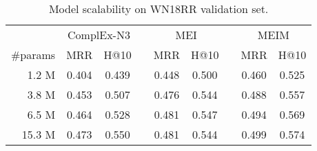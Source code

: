 \documentclass{article}
\theoremstyle{plain}
\theoremstyle{remark}
\begin{document}
\begin{table}[t]
	\centering  
	\begin{adjustbox}{max width=\linewidth}
		\begin{tabular}{@{\extracolsep{-4pt}}rcclcclcc}


			& \multicolumn{2}{c}{ComplEx-N3} && \multicolumn{2}{c}{MEI} && \multicolumn{2}{c}{MEIM} \\
			\cmidrule{2-3} \cmidrule{5-6} \cmidrule{8-9}
			\#params & MRR & H@10 && MRR & H@10 && MRR & H@10 \\
			\cmidrule{1-3} \cmidrule{5-6} \cmidrule{8-9}
			
			1.2 M & 0.404 & 0.439 && 0.448 & 0.500 && 0.460 & 0.525 \\ 3.8 M & 0.453 & 0.507 && 0.476 & 0.544 && 0.488 & 0.557 \\ 6.5 M & 0.464 & 0.528 && 0.481 & 0.547 && 0.494 & 0.569 \\ 15.3 M & 0.473 & 0.550 && 0.481 & 0.544 && 0.499 & 0.574 \\ 

\end{tabular}
	\end{adjustbox}
	\caption[]{Model scalability on WN18RR validation set.}
	\label{tab:param_scale}
\end{table}
\end{document}
